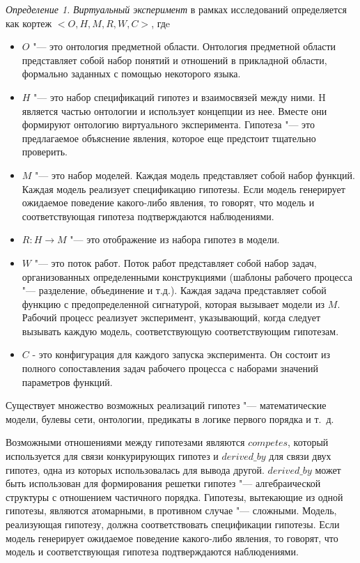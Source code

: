 \textit{Определение 1.} \textit{Виртуальный эксперимент} в рамках исследований определяется как 
кортеж $<O, H, M, R, W, C>$, гдe
\begin{itemize}
    \item $O$ "--- это онтология предметной области. Онтология предметной области представляет собой набор понятий и 
            отношений в прикладной области, формально заданных с помощью некоторого языка.
    \item $H$ "--- это набор спецификаций гипотез и взаимосвязей между ними. H является частью онтологии и использует 
            концепции из нее. Вместе они формируют онтологию виртуального эксперимента. Гипотеза "--- это предлагаемое 
            объяснение явления, которое еще предстоит тщательно проверить. 
    \item $M$ "--- это набор моделей. Каждая модель представляет собой набор функций. Каждая модель реализует 
            спецификацию гипотезы. Если модель генерирует ожидаемое поведение какого-либо явления, то говорят, что 
            модель и соответствующая гипотеза подтверждаются наблюдениями.
    \item $R: H \to M$ "--- это отображение из набора гипотез в модели.
    \item $W$ "--- это поток работ. Поток работ представляет собой набор задач, организованных определенными 
            конструкциями (шаблоны рабочего процесса "--- разделение, объединение и т.д.). Каждая задача представляет 
            собой функцию с предопределенной сигнатурой, которая вызывает модели из $M$. Рабочий процесс реализует 
            эксперимент, указывающий, когда следует вызывать каждую модель, соответствующую соответствующим гипотезам. 
    \item $C$ - это конфигурация для каждого запуска эксперимента. Он состоит из полного сопоставления задач 
            рабочего процесса с наборами значений параметров функций.
\end{itemize}

Существует множество возможных реализаций гипотез "--- математические модели, булевы сети, онтологии, предикаты в 
логике первого порядка и т.~д.

Возможными отношениями между гипотезами являются $competes$, который используется для связи конкурирующих гипотез 
и $derived\_by$ для связи двух гипотез, одна из которых использовалась для вывода другой. $derived\_by$ может быть 
использован для формирования решетки гипотез "--- алгебраической структуры с отношением частичного порядка. 
Гипотезы, вытекающие из одной гипотезы, являются атомарными, в противном случае "--- сложными. 
Модель, реализующая гипотезу, должна соответствовать спецификации гипотезы. Если модель генерирует ожидаемое поведение 
какого-либо явления, то говорят, что модель и соответствующая гипотеза подтверждаются наблюдениями.

